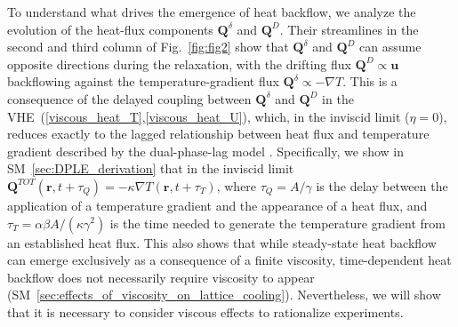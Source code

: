 \documentclass[
prb,
twocolumn,
superscriptaddress,
 amsmath,amssymb,
 aps,
longbibliography,
]{revtex4-2}
\begin{document}
To understand what drives the emergence of heat backflow, we analyze the evolution of the heat-flux components $\bm{Q}^{\delta}$ and $\bm{Q}^{D}$.
Their streamlines in the second and third column of Fig.~\ref{fig:fig2} show that $\bm{Q}^{\delta}$ and $\bm{Q}^{D}$ can assume opposite directions during the relaxation, with the drifting flux $\bm{Q}^{D}{\propto}\bm{u}$ backflowing against the temperature-gradient flux $\bm{Q}^{\delta}{\propto}{-}\nabla T$. This is a consequence of the delayed coupling between $\bm{Q}^{\delta}$ and $\bm{Q}^{D}$ in the VHE~(\ref{viscous_heat_T},\ref{viscous_heat_U}), which, in the inviscid limit ($\eta{=}0$),
reduces exactly to the lagged relationship between heat flux and temperature gradient described by the dual-phase-lag model \cite{tzou_unified_1995}. Specifically, we show in SM~\ref{sec:DPLE_derivation} that in the inviscid limit $\bm{Q}^{TOT}(\bm{r},t{+}\tau_Q){=}{-}\kappa\nabla T(\bm{r},t{+}\tau_T)$, where $\tau_Q{=}A/\gamma$ is the delay between the application of a temperature gradient and the appearance of a heat flux,
and $\tau_T{=}\alpha\beta A/(\kappa\gamma^2)$ is the time needed to generate the temperature gradient from an established heat flux.
This also shows that while steady-state heat backflow can emerge exclusively as a consequence of a finite viscosity, time-dependent heat backflow does not necessarily require viscosity to appear (SM~\ref{sec:effects_of_viscosity_on_lattice_cooling}). Nevertheless, we will show that it is necessary to consider viscous effects to rationalize experiments.
\end{document}
